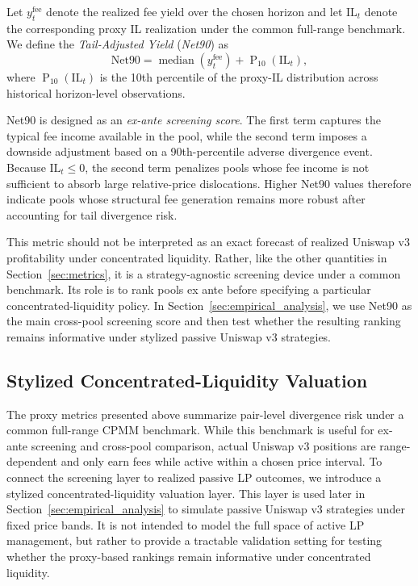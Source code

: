 \documentclass[anonymous]{lipics-v2021}
\begin{document}
Let $y^{\text{fee}}_t$ denote the realized fee yield over the chosen horizon and let $\mathrm{IL}_t$ denote the corresponding proxy IL realization under the common full-range benchmark. We define the \emph{Tail-Adjusted Yield} (\emph{Net90}) as
\begin{equation}
\label{eq:net90}
\mathrm{Net90}
=
\operatorname{median}\!\left(y^{\text{fee}}_{t}\right)
+
\operatorname{P}_{10}\!\left(\mathrm{IL}_{t}\right),
\end{equation}
where $\operatorname{P}_{10}(\mathrm{IL}_t)$ is the 10th percentile of the proxy-IL distribution across historical horizon-level observations.

Net90 is designed as an \emph{ex-ante screening score}. The first term captures the typical fee income available in the pool, while the second term imposes a downside adjustment based on a 90th-percentile adverse divergence event. Because $\mathrm{IL}_t \le 0$, the second term penalizes pools whose fee income is not sufficient to absorb large relative-price dislocations. Higher Net90 values therefore indicate pools whose structural fee generation remains more robust after accounting for tail divergence risk.

This metric should not be interpreted as an exact forecast of realized Uniswap v3 profitability under concentrated liquidity. Rather, like the other quantities in Section~\ref{sec:metrics}, it is a strategy-agnostic screening device under a common benchmark. Its role is to rank pools ex ante before specifying a particular concentrated-liquidity policy. In Section~\ref{sec:empirical_analysis}, we use Net90 as the main cross-pool screening score and then test whether the resulting ranking remains informative under stylized passive Uniswap v3 strategies.


\subsection{{Stylized Concentrated-Liquidity Valuation}}
\label{subsec:cl_valuation}

{The proxy metrics presented above summarize pair-level divergence risk under a common full-range CPMM benchmark. While this benchmark is useful for ex-ante screening and cross-pool comparison, actual Uniswap v3 positions are range-dependent and only earn fees while active within a chosen price interval. To connect the screening layer to realized passive LP outcomes, we introduce a stylized concentrated-liquidity valuation layer. This layer is used later in Section~\ref{sec:empirical_analysis} to simulate passive Uniswap v3 strategies under fixed price bands. It is not intended to model the full space of active LP management, but rather to provide a tractable validation setting for testing whether the proxy-based rankings remain informative under concentrated liquidity.}
\end{document}
